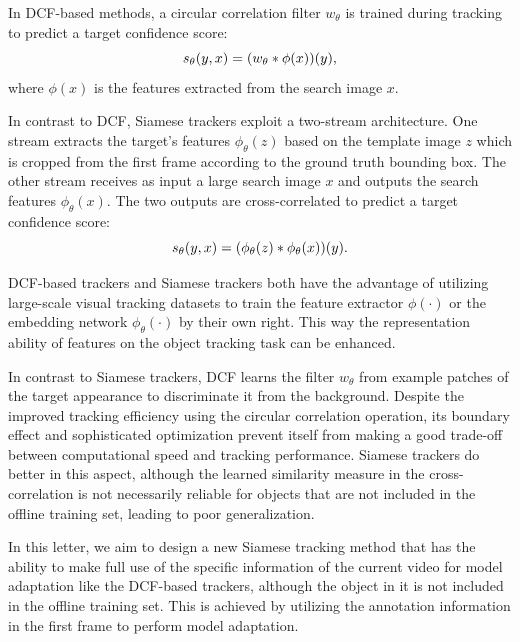 In DCF-based methods, a circular correlation filter $w_{\theta}$ is trained during tracking to predict a target confidence score:
\vspace{-0.1cm}
\begin{equation}
    s_\theta(y,x)=(w_\theta * \phi(x))(y),
    \vspace{-0.1cm}
    \label{equ:dcf}
\end{equation}
where $\phi(x)$ is the features extracted from the search image $x$.

In contrast to DCF, Siamese trackers exploit a two-stream architecture. One stream extracts the target’s features $\phi_\theta(z)$ based on the template image $z$ which is cropped from the first frame according to the ground truth bounding box. The other stream receives as input a large search image $x$ and outputs the search features $\phi_\theta(x)$. The two outputs are cross-correlated to predict a target confidence score:
\vspace{-0.1cm}
\begin{equation}
    s_\theta(y,x)=(\phi_\theta(z) * \phi_\theta(x))(y).
    \vspace{-0.1cm}
    \label{equ:siamese}
\end{equation}

DCF-based trackers and Siamese trackers both have the advantage of utilizing large-scale visual tracking datasets to train the feature extractor $\phi(\cdot)$ or the embedding network $\phi_{\theta}(\cdot)$ by their own right. This way the representation ability of features on the object tracking task can be enhanced. 

In contrast to Siamese trackers, DCF learns the filter $w_\theta$ from example patches of the target appearance to discriminate it from the background.
Despite the improved tracking efficiency using the circular correlation operation, its boundary effect and sophisticated optimization prevent itself from making a good trade-off between computational speed and tracking performance. Siamese trackers do better in this aspect, although the learned similarity measure in the cross-correlation is not necessarily reliable for objects that are not included in the offline training set, leading to poor generalization.

In this letter, we aim to design a new Siamese tracking method that has the ability to make full use of the specific information of the current video for model adaptation like the DCF-based trackers, although the object in it is not included in the offline training set. This is achieved by utilizing the annotation information in the first frame to perform model adaptation.

